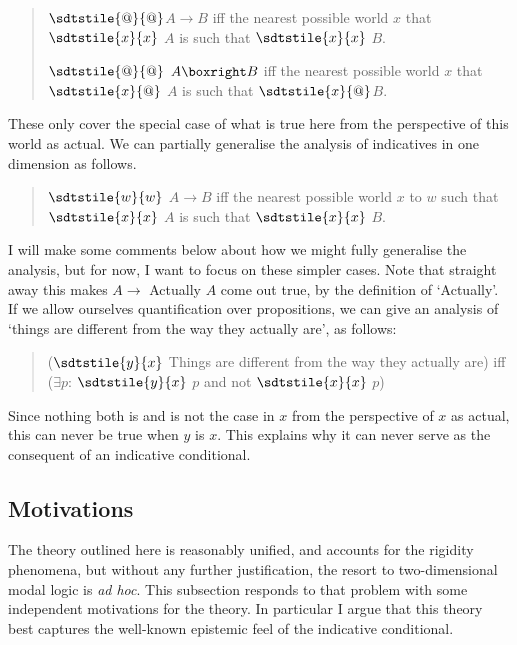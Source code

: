 \begin{quote}
\(\sdtstile{@}{@}\)\(A \rightarrow B\) iff the nearest possible world \(x\) that \(\sdtstile{x}{x}\) \(A\) is such that \(\sdtstile{x}{x}\) \(B\).

\(\sdtstile{@}{@}\)  \(A \boxright B\) iff the nearest possible world \(x\) that \(\sdtstile{x}{@}\) \(A\) is such that \(\sdtstile{x}{@}\)\(B\).
\end{quote}

\noindent These only cover the special case of what is true here from the perspective of this world as actual. We can partially generalise the analysis of indicatives in one dimension as follows.

\begin{quote}
\(\sdtstile{w}{w}\) \(A \rightarrow B\) iff the nearest possible world \(x\) to \(w\) such that \(\sdtstile{x}{x}\) \(A\) is such that \(\sdtstile{x}{x}\) \(B\).
\end{quote}

\noindent I will make some comments below about how we might fully generalise the analysis, but for now, I want to focus on these simpler cases. Note that straight away this makes \(A \rightarrow\) Actually \(A\) come out true, by the definition of `Actually'. If we allow ourselves quantification over propositions, we can give an analysis of `things are different from the way they actually are', as follows:

\begin{quote}
(\(\sdtstile{y}{x}\) Things are different from the way they actually are) iff \\ (\(\exists\)\(p\): \(\sdtstile{y}{x}\)  \(p\) and not \(\sdtstile{x}{x}\) \(p\))
\end{quote}

\noindent Since nothing both is and is not the case in \(x\) from the perspective of \(x\) as actual, this can never be true when \(y\) is \(x\). This explains why it can never serve as the consequent of an indicative conditional.

\subsection[Motivations]{Motivations}
The theory outlined here is reasonably unified, and accounts for the rigidity phenomena, but without any further justification, the resort to two-dimensional modal logic is \textit{ad hoc}. This subsection responds to that problem with some independent motivations for the theory. In particular I argue that this theory best captures the well-known epistemic feel of the indicative conditional.

